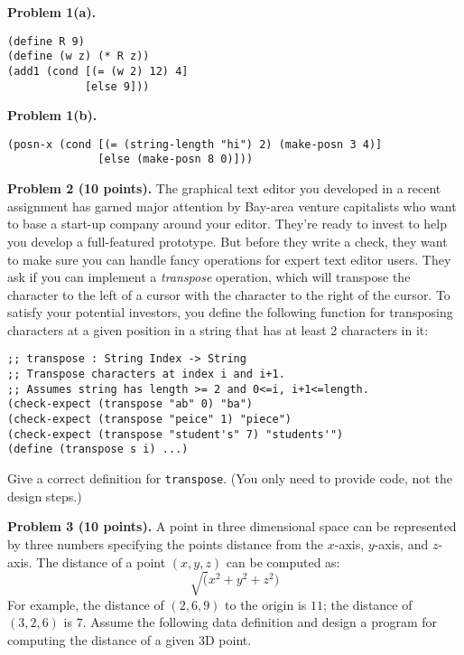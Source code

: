 \documentclass[12pt]{article}
\begin{document}
\noindent
{\bf Problem 1(a).}

\begin{verbatim}
(define R 9)
(define (w z) (* R z))
(add1 (cond [(= (w 2) 12) 4]
            [else 9]))
\end{verbatim}

\vskip 2.5in

\noindent
{\bf Problem 1(b).}

\begin{verbatim}
(posn-x (cond [(= (string-length "hi") 2) (make-posn 3 4)]
              [else (make-posn 8 0)]))
\end{verbatim}
  

\newpage

\noindent
{\bf Problem 2 (10 points).}
%
The graphical text editor you developed in a recent assignment has
garned major attention by Bay-area venture capitalists who want to
base a start-up company around your editor.  They're ready to invest
to help you develop a full-featured prototype.  But before they write
a check, they want to make sure you can handle fancy operations for
expert text editor users.  They ask if you can implement a
\emph{transpose} operation, which will transpose the character to the
left of a cursor with the character to the right of the cursor.  To
satisfy your potential investors, you define the following function
for transposing characters at a given position in a string that has at
least 2 characters in it:
\begin{verbatim}
;; transpose : String Index -> String
;; Transpose characters at index i and i+1.
;; Assumes string has length >= 2 and 0<=i, i+1<=length.
(check-expect (transpose "ab" 0) "ba")
(check-expect (transpose "peice" 1) "piece")
(check-expect (transpose "student's" 7) "students'")
(define (transpose s i) ...)
\end{verbatim}

\noindent
Give a correct definition for \verb|transpose|.  (You only need to
provide code, not the design steps.)

\newpage 
\noindent
{\bf Problem 3 (10 points).}
%
A point in three dimensional space can be represented by three numbers
specifying the points distance from the $x$-axis, $y$-axis, and
$z$-axis.  The distance of a point $(x,y,z)$ can be computed as:
\[\sqrt(x^2+y^2+z^2)\]
For example, the distance of $(2,6,9)$ to the origin is $11$; the
distance of $(3,2,6)$ is $7$.  Assume the following data definition
and design a program for computing the distance of a given 3D
point.
\end{document}
